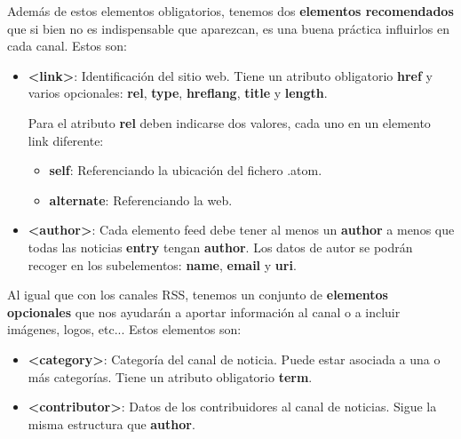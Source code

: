 \begin{enumerate}
    Además de estos elementos obligatorios, tenemos dos \textbf{elementos recomendados} que si bien no es indispensable que aparezcan, es una buena práctica influirlos en cada canal. Estos son:

    \begin{itemize}
        \item \textbf{<link>}: Identificación del sitio web. Tiene un atributo obligatorio \textbf{href} y varios opcionales: \textbf{rel}, \textbf{type}, \textbf{hreflang}, \textbf{title} y \textbf{length}.

        Para el atributo \textbf{rel} deben indicarse dos valores, cada uno en un elemento link diferente:
        \begin{itemize}
            \item \textbf{self}: Referenciando la ubicación del fichero .atom.
            \item \textbf{alternate}: Referenciando la web.
        \end{itemize}

        \item \textbf{<author>}: Cada elemento feed debe tener al menos un \textbf{author} a menos que todas las noticias \textbf{entry} tengan \textbf{author}. Los datos de autor se podrán recoger en los subelementos: \textbf{name}, \textbf{email} y \textbf{uri}.
    \end{itemize}

    Al igual que con los canales RSS, tenemos un conjunto de \textbf{elementos opcionales} que nos ayudarán a aportar información al canal o a incluir imágenes, logos, etc... Estos elementos son:

    \begin{itemize}
        \item \textbf{<category>}: Categoría del canal de noticia. Puede estar asociada a una o más categorías. Tiene un atributo obligatorio \textbf{term}.

        \item \textbf{<contributor>}: Datos de los contribuidores al canal de noticias. Sigue la misma estructura que \textbf{author}.
    \end{itemize}
\end{enumerate}




\glsaddall
\printglossaries


\newpage
{}



